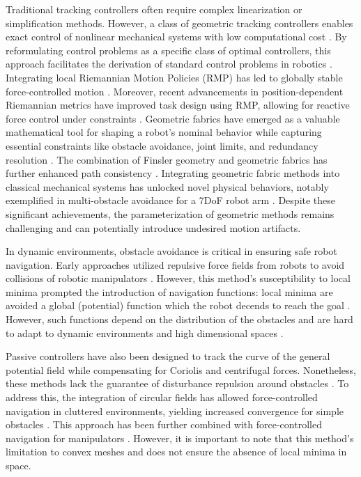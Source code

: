 Traditional tracking controllers often require complex linearization or simplification methods. However, a class of geometric tracking controllers enables exact control of nonlinear mechanical systems with low computational cost \cite{udwadia2003new}. By reformulating control problems as a specific class of optimal controllers, this approach facilitates the derivation of standard control problems in robotics \cite{peters2008unifying}.
Integrating local Riemannian Motion Policies (RMP) has led to globally stable force-controlled motion \cite{cheng2020rmp}. Moreover, recent advancements in position-dependent Riemannian metrics have improved task design using RMP, allowing for reactive force control under constraints \cite{bylard2021composable}.
Geometric fabrics have emerged as a valuable mathematical tool for shaping a robot's nominal behavior while capturing essential constraints like obstacle avoidance, joint limits, and redundancy resolution \cite{xie2020geometric}. The combination of Finsler geometry and geometric fabrics has further enhanced path consistency \cite{ratliff2021generalized}.
Integrating geometric fabric methods into classical mechanical systems has unlocked novel physical behaviors, notably exemplified in multi-obstacle avoidance for a 7DoF robot arm \cite{van2022geometric}. Despite these significant achievements, the parameterization of geometric methods remains challenging and can potentially introduce undesired motion artifacts.

In dynamic environments, obstacle avoidance is critical in ensuring safe robot navigation. Early approaches utilized repulsive force fields from robots to avoid collisions of robotic manipulators \cite{khatib1987unified}. 
However, this method's susceptibility to local minima prompted the introduction of navigation functions: local minima are avoided a global (potential) function which the robot decends to reach the goal \cite{koditschek1990robot}. However, such functions depend on the distribution of the obstacles and are hard to adapt to dynamic environments and high dimensional spaces \cite{loizou2022mobile}.

Passive controllers have also been designed to track the curve of the general potential field while compensating for Coriolis and centrifugal forces. Nonetheless, these methods lack the guarantee of disturbance repulsion around obstacles \cite{duindam2004passive}. To address this, the integration of circular fields \cite{singh1996real} has allowed force-controlled navigation in cluttered environments, yielding increased convergence for simple obstacles \cite{haddadin2010real, haddadin2011dynamic}. This approach has been further combined with force-controlled navigation for manipulators \cite{tulbure2020closing}. 
However, it is important to note that this method's limitation to convex meshes and does not ensure the absence of local minima in space.

